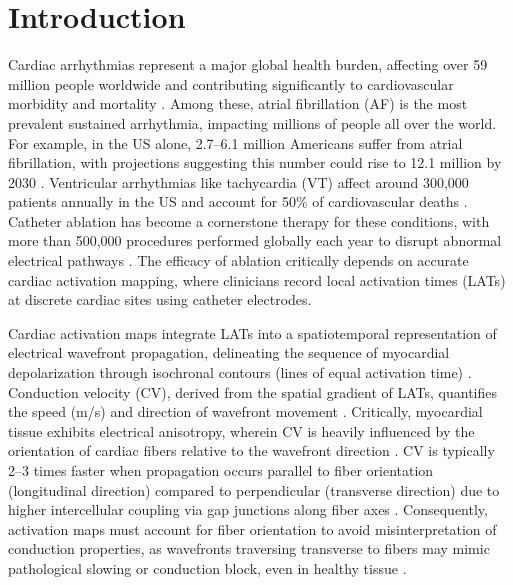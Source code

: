 \section{Introduction}

Cardiac arrhythmias represent a major global health burden, affecting over 59 million people worldwide and contributing significantly to cardiovascular morbidity and mortality \cite{roth2020}. Among these, atrial fibrillation (AF) is the most prevalent sustained arrhythmia, impacting millions of people all over the world. For example, in the US alone, 2.7–6.1 million Americans suffer from atrial fibrillation, with projections suggesting this number could rise to 12.1 million by 2030 \cite{roth2020, Colilla2013}. Ventricular arrhythmias like tachycardia (VT) affect around 300,000 patients annually in the US and account for 50\% of cardiovascular deaths \cite{AlKhatib2018}. Catheter ablation has become a cornerstone therapy for these conditions, with more than 500,000 procedures performed globally each year to disrupt abnormal electrical pathways \cite{Calkins2017}. The efficacy of ablation critically depends on accurate cardiac activation mapping, where clinicians record local activation times (LATs) at discrete cardiac sites using catheter electrodes.

Cardiac activation maps integrate LATs into a spatiotemporal representation of electrical wavefront propagation, delineating the sequence of myocardial depolarization through isochronal contours (lines of equal activation time) \cite{DURRER1970}. Conduction velocity (CV), derived from the spatial gradient of LATs, quantifies the speed (m/s) and direction of wavefront movement \cite{ColliFranzone1998}. Critically, myocardial tissue exhibits electrical anisotropy, wherein CV is heavily influenced by the orientation of cardiac fibers relative to the wavefront direction \cite{Spach1981}. CV is typically 2–3 times faster when propagation occurs parallel to fiber orientation (longitudinal direction) compared to perpendicular (transverse direction) due to higher intercellular coupling via gap junctions along fiber axes \cite{Spach1981,KLBER2004}. Consequently, activation maps must account for fiber orientation to avoid misinterpretation of conduction properties, as wavefronts traversing transverse to fibers may mimic pathological slowing or conduction block, even in healthy tissue \cite{Spach1981,Taccardi1994}.
